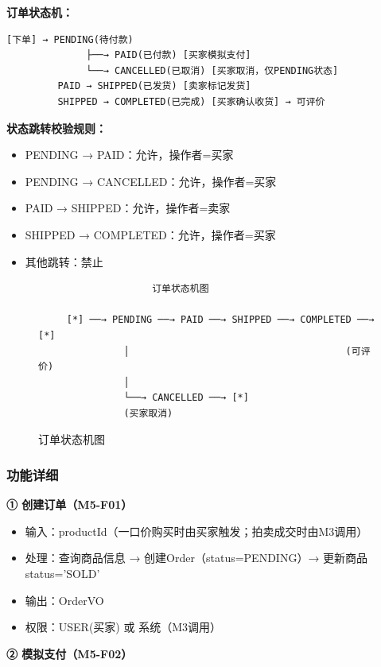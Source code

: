 \documentclass[12pt,a4paper]{ctexart}
\numberwithin{figure}{section}
\numberwithin{table}{section}
\begin{document}
\textbf{订单状态机：}

\begin{verbatim}
[下单] → PENDING(待付款)
              ├──→ PAID(已付款) [买家模拟支付]
              └──→ CANCELLED(已取消) [买家取消，仅PENDING状态]
         PAID → SHIPPED(已发货) [卖家标记发货]
         SHIPPED → COMPLETED(已完成) [买家确认收货] → 可评价
\end{verbatim}

\textbf{状态跳转校验规则：}

\begin{itemize}
    \item PENDING → PAID：允许，操作者=买家
    \item PENDING → CANCELLED：允许，操作者=买家
    \item PAID → SHIPPED：允许，操作者=卖家
    \item SHIPPED → COMPLETED：允许，操作者=买家
    \item 其他跳转：禁止
\end{itemize}

\begin{figure}[H]
\centering
{\small
\begin{verbatim}
                    订单状态机图

     [*] ──→ PENDING ──→ PAID ──→ SHIPPED ──→ COMPLETED ──→ [*]
               │                                      (可评价)
               │
               └──→ CANCELLED ──→ [*]
               (买家取消)
\end{verbatim}
}
\caption{订单状态机图}
\label{fig:m5-state}
\end{figure}

\subsubsection{功能详细}

\textbf{① 创建订单（M5-F01）}

\begin{itemize}
    \item 输入：productId（一口价购买时由买家触发；拍卖成交时由M3调用）
    \item 处理：查询商品信息 → 创建Order（status=PENDING）→ 更新商品status='SOLD'
    \item 输出：OrderVO
    \item 权限：USER(买家) 或 系统（M3调用）
\end{itemize}

\textbf{② 模拟支付（M5-F02）}
\end{document}
